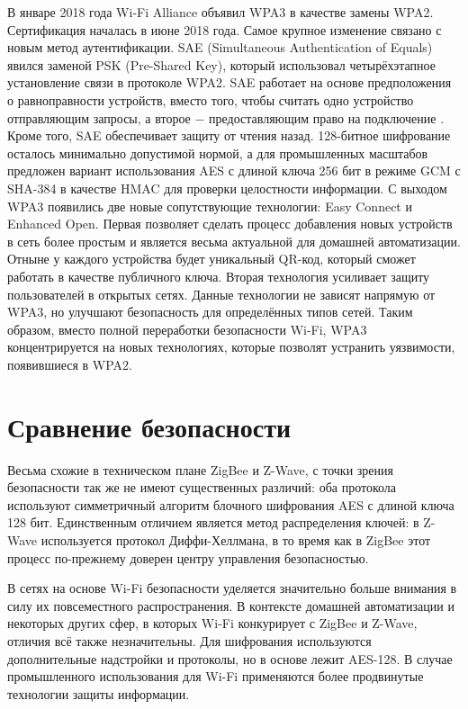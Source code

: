 	В январе 2018 года Wi-Fi Alliance объявил WPA3 в качестве замены WPA2. Сертификация началась в июне 
	2018 года. Самое крупное изменение связано с новым метод аутентификации. SAE (Simultaneous 
	Authentication of Equals) явился заменой PSK (Pre-Shared Key), который использовал четырёхэтапное 
	установление связи в протоколе WPA2. SAE работает на основе предположения о равноправности 
	устройств, вместо того, чтобы считать одно устройство отправляющим запросы, а второе $-$ предоставляющим 
	право на подключение \cite{802.11-2016}.  Кроме того, SAE обеспечивает защиту от чтения назад. 128-битное шифрование
	осталось минимально допустимой нормой, а для промышленных масштабов предложен вариант использования
	AES с длиной ключа 256 бит в режиме GCM с SHA-384 в качестве HMAC для проверки целостности информации.
	С выходом WPA3 появились две новые сопутствующие технологии: Easy Connect  и Enhanced Open. Первая
	позволяет сделать процесс добавления новых устройств в сеть более простым и является весьма актуальной
	для домашней автоматизации. Отныне у каждого устройства будет уникальный QR-код, который сможет
	работать в качестве публичного ключа. Вторая технология усиливает защиту пользователей в открытых сетях.
	Данные технологии не зависят напрямую от WPA3, но улучшают безопасность для определённых типов сетей.
	Таким образом, вместо полной переработки безопасности Wi-Fi, WPA3 концентрируется на новых технологиях, 
	которые позволят устранить уязвимости, появившиеся в WPA2.
	
	
	\section{Сравнение безопасности}
	Весьма схожие в техническом плане ZigBee и Z-Wave, с точки зрения безопасности так же не имеют
	существенных различий: оба протокола используют симметричный алгоритм блочного шифрования
	AES с длиной ключа 128 бит. Единственным отличием является метод распределения ключей: в Z-Wave
	используется протокол Диффи-Хеллмана, в то время как в ZigBee этот процесс по-прежнему доверен
	центру управления безопасностью.
	
	В сетях на основе Wi-Fi безопасности уделяется значительно больше внимания в силу их повсеместного
	распространения. В контексте домашней автоматизации и некоторых других сфер, в которых Wi-Fi
	конкурирует с ZigBee и Z-Wave, отличия всё также незначительны. Для шифрования используются
	дополнительные надстройки и протоколы, но в основе лежит AES-128. В случае промышленного
	использования для Wi-Fi применяются более продвинутые технологии защиты информации.
	